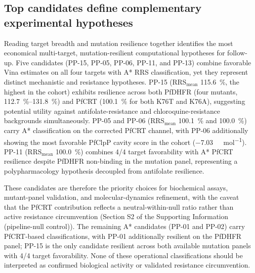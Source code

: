 \documentclass[11pt,a4paper]{article}
\begin{document}
	\subsection{Top candidates define complementary experimental hypotheses}\label{sec:disc_top}
	Reading target breadth and mutation resilience together identifies the most economical multi-target, mutation-resilient computational hypotheses for follow-up. Five candidates (PP-15, PP-05, PP-06, PP-11, and PP-13) combine favorable Vina estimates on all four targets with A* RRS classification, yet they represent distinct mechanistic and resistance hypotheses. PP-15 (RRS$_{\mathrm{mean}}$ \qty{115.6}{\percent}, the highest in the cohort) exhibits resilience across both PfDHFR (four mutants, \qtyrange{112.7}{131.8}{\percent}) and PfCRT (\qty{100.1}{\percent} for both K76T and K76A), suggesting potential utility against antifolate-resistance and chloroquine-resistance backgrounds simultaneously. PP-05 and PP-06 (RRS$_{\mathrm{mean}}$ \qty{100.1}{\percent} and \qty{100.0}{\percent}) carry A* classification on the corrected PfCRT channel, with PP-06 additionally showing the most favorable PfClpP cavity score in the cohort (\qty{-7.03}{\kilo\calorie\per\mol}). PP-11 (RRS$_{\mathrm{mean}}$ \qty{100.0}{\percent}) combines \num{4}/\num{4} target favorability with A* PfCRT resilience despite PfDHFR non-binding in the mutation panel, representing a polypharmacology hypothesis decoupled from antifolate resilience.
	
	These candidates are therefore the priority choices for biochemical assays, mutant-panel validation, and molecular-dynamics refinement, with the caveat that the PfCRT contribution reflects a neutral-within-null ratio rather than active resistance circumvention (Section S2 of the Supporting Information (pipeline-null control)). The remaining A* candidates (PP-01 and PP-02) carry PfCRT-based classifications, with PP-01 additionally resilient on the PfDHFR panel; PP-15 is the only candidate resilient across both available mutation panels with \num{4}/\num{4} target favorability. None of these operational classifications should be interpreted as confirmed biological activity or validated resistance circumvention.
	
\end{document}
